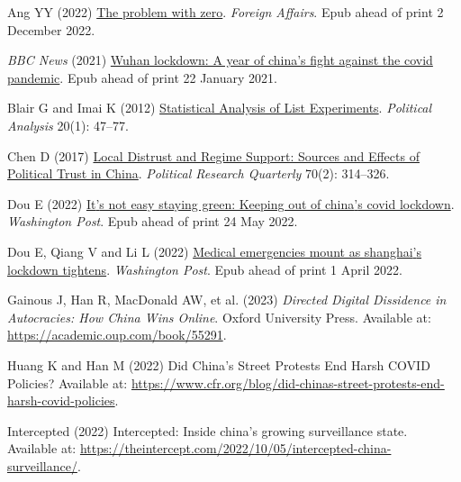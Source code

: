 \documentclass[
  letterpaper,
  DIV=11,
  numbers=noendperiod]{scrartcl}
\newlength{\cslhangindent}
\newlength{\cslentryspacingunit} %
\newenvironment{CSLReferences}[2] %
 {%
  \setlength{\parindent}{0pt}
  \ifodd #1
  \let\oldpar\par
  \def\par{\hangindent=\cslhangindent\oldpar}
  \fi
  \setlength{\parskip}{#2\cslentryspacingunit}
 }%
 {}
\begin{document}
\hypertarget{refs}{}
\begin{CSLReferences}{1}{0}
\leavevmode{}%
Ang YY (2022)
\href{https://www.foreignaffairs.com/china/problem-zero-xi-pandemic-policy-crisis}{The
problem with zero}. \emph{Foreign Affairs}. Epub ahead of print 2
December 2022.

\leavevmode{}%
\emph{BBC News} (2021)
\href{https://www.bbc.com/news/world-asia-china-55628488}{Wuhan
lockdown: A year of china's fight against the covid pandemic}. Epub
ahead of print 22 January 2021.

\leavevmode{}%
Blair G and Imai K (2012)
\href{https://doi.org/10.1093/pan/mpr048}{Statistical Analysis of List
Experiments}. \emph{Political Analysis} 20(1): 47--77.

\leavevmode{}%
Chen D (2017) \href{https://doi.org/10.1177/1065912917691360}{Local
Distrust and Regime Support: Sources and Effects of Political Trust in
China}. \emph{Political Research Quarterly} 70(2): 314--326.

\leavevmode{}%
Dou E (2022)
\href{https://www.washingtonpost.com/world/2022/05/24/china-covid-lockdown-testing-green/}{It{'}s
not easy staying green: Keeping out of china{'}s covid lockdown}.
\emph{Washington Post}. Epub ahead of print 24 May 2022.

\leavevmode{}%
Dou E, Qiang V and Li L (2022)
\href{https://www.washingtonpost.com/world/2022/04/01/china-shanghai-medical-emergencies-coronavirus-lockdown/}{Medical
emergencies mount as shanghai{'}s lockdown tightens}. \emph{Washington
Post}. Epub ahead of print 1 April 2022.

\leavevmode{}%
Gainous J, Han R, MacDonald AW, et al. (2023) \emph{Directed Digital
Dissidence in Autocracies: How China Wins Online}. Oxford University
Press. Available at: \url{https://academic.oup.com/book/55291}.

\leavevmode{}%
Huang K and Han M (2022) Did China{'}s Street Protests End Harsh COVID
Policies? Available at:
\url{https://www.cfr.org/blog/did-chinas-street-protests-end-harsh-covid-policies}.

\leavevmode{}%
Intercepted (2022) Intercepted: Inside china{'}s growing surveillance
state. Available at:
\url{https://theintercept.com/2022/10/05/intercepted-china-surveillance/}.


\end{CSLReferences}
\end{document}
